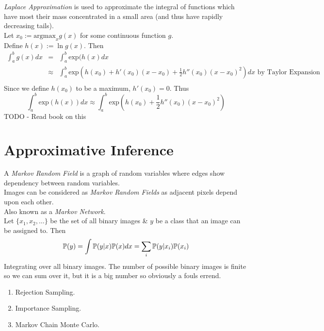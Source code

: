 \documentclass[11pt,a4paper]{article}
\begin{document}
\textit{Laplace Approximation} is used to approximate the integral of functions which have most their mass concentrated in a small area (and thus have rapidly decreasing tails).\\
Let $x_0:=\text{argmax}_xg(x)$ for some continuous function $g$.\\
Define $h(x):=\ln g(x)$. Then
\[\begin{array}{rcl}
\displaystyle\int_a^bg(x)dx&=&{\displaystyle\int_a^b\text{exp}(h(x)dx}\\
&\approx&{\displaystyle\int_a^b\text{exp}\left(h(x_0)+h'(x_0)(x-x_0)+\frac{1}{2}h''(x_0)(x-x_0)^2\right)dx\text{ by Taylor Expansion}}\\
\end{array}\]
Since we define $h(x_0)$ to be a maximum, $h'(x_0)=0$. Thus
$$\int_a^b\text{exp}(h(x))dx\approx\int_a^b\text{exp}\left(h(x_0)+\frac{1}{2}h''(x_0)(x-x_0)^2\right)$$
TODO - Read book on this

\section{Approximative Inference}

A \textit{Markov Random Field} is a graph of random variables where edges show dependency between random variables.\\
Images can be considered as \textit{Markov Random Fields} as adjacent pixels depend upon each other.\\
\nb Also known as a \textit{Markov Network}.\\

Let $\{x_1,x_2,\dots\}$ be the set of all binary images \& $y$ be a class that an image can be assigned to. Then
$$\mathbb{P}(y)=\int\mathbb{P}(y|x)\mathbb{P}(x)dx=\sum_i\mathbb{P}(y|x_i)\mathbb{P}(x_i)$$
\ie Integrating over all binary images. The number of possible binary images is finite so we can sum over it, but it is a big number so obviously a fouls errend.\\

\begin{enumerate}[label=\roman*)]
	\item Rejection Sampling.
	\item Importance Sampling.
	\item Markov Chain Monte Carlo.
\end{enumerate}
\end{document}
